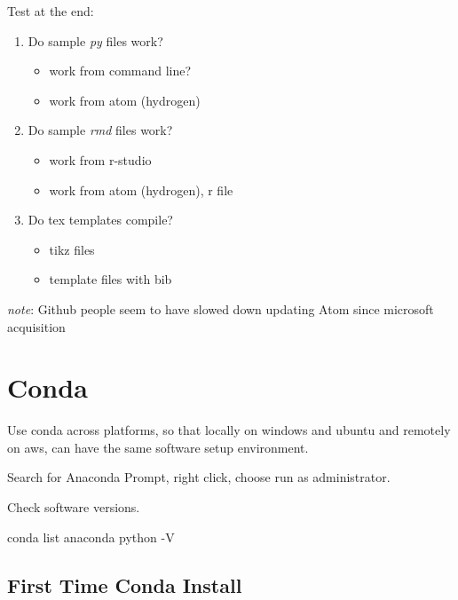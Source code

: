 \documentclass[]{article}
\newenvironment{Shaded}{\begin{snugshade}}{\end{snugshade}}
\newcommand{\ExtensionTok}[1]{#1}
\newcommand{\NormalTok}[1]{#1}
\providecommand{\tightlist}{%
  \setlength{\itemsep}{0pt}\setlength{\parskip}{0pt}}
\begin{document}
Test at the end:

\begin{enumerate}
\def\labelenumi{\arabic{enumi}.}
\tightlist
\item
  Do sample \emph{py} files work?

  \begin{itemize}
  \tightlist
  \item
    work from command line?
  \item
    work from atom (hydrogen)
  \end{itemize}
\item
  Do sample \emph{rmd} files work?

  \begin{itemize}
  \tightlist
  \item
    work from r-studio
  \item
    work from atom (hydrogen), r file
  \end{itemize}
\item
  Do tex templates compile?

  \begin{itemize}
  \tightlist
  \item
    tikz files
  \item
    template files with bib
  \end{itemize}
\end{enumerate}

\emph{note}: Github people seem to have slowed down updating Atom since
microsoft acquisition

\hypertarget{conda}{%
\section{Conda}\label{conda}}

Use conda across platforms, so that locally on windows and ubuntu and
remotely on aws, can have the same software setup environment.

Search for Anaconda Prompt, right click, choose run as administrator.

Check software versions.

\begin{Shaded}
\begin{Highlighting}[]
\ExtensionTok{conda}\NormalTok{ list anaconda}
\ExtensionTok{python}\NormalTok{ -V}
\end{Highlighting}
\end{Shaded}

\hypertarget{first-time-conda-install}{%
\subsection{First Time Conda Install}\label{first-time-conda-install}}
\end{document}
